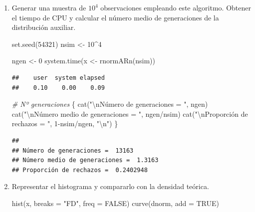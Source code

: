 \documentclass[
]{book}
\newenvironment{Shaded}{\begin{snugshade}}{\end{snugshade}}
\newcommand{\AttributeTok}[1]{\textcolor[rgb]{0.77,0.63,0.00}{#1}}
\newcommand{\CommentTok}[1]{\textcolor[rgb]{0.56,0.35,0.01}{\textit{#1}}}
\newcommand{\ConstantTok}[1]{\textcolor[rgb]{0.00,0.00,0.00}{#1}}
\newcommand{\DecValTok}[1]{\textcolor[rgb]{0.00,0.00,0.81}{#1}}
\newcommand{\FunctionTok}[1]{\textcolor[rgb]{0.00,0.00,0.00}{#1}}
\newcommand{\NormalTok}[1]{#1}
\newcommand{\OtherTok}[1]{\textcolor[rgb]{0.56,0.35,0.01}{#1}}
\newcommand{\SpecialCharTok}[1]{\textcolor[rgb]{0.00,0.00,0.00}{#1}}
\newcommand{\StringTok}[1]{\textcolor[rgb]{0.31,0.60,0.02}{#1}}
\theoremstyle{break}
\theoremstyle{definition}
\theoremstyle{definition}
\theoremstyle{definition}
\theoremstyle{definition}
\theoremstyle{remark}
\begin{document}
\begin{enumerate}
\def\labelenumi{\alph{enumi})}
\item
  Generar una muestra de \(10^{4}\) observaciones empleando este
  algoritmo. Obtener el tiempo de CPU y calcular el número medio
  de generaciones de la distribución auxiliar.

\begin{Shaded}
\begin{Highlighting}[]
\FunctionTok{set.seed}\NormalTok{(}\DecValTok{54321}\NormalTok{)}
\NormalTok{nsim }\OtherTok{\textless{}{-}} \DecValTok{10}\SpecialCharTok{\^{}}\DecValTok{4}

\NormalTok{ngen }\OtherTok{\textless{}{-}} \DecValTok{0}
\FunctionTok{system.time}\NormalTok{(x }\OtherTok{\textless{}{-}} \FunctionTok{rnormARn}\NormalTok{(nsim))}
\end{Highlighting}
\end{Shaded}

\begin{verbatim}
##    user  system elapsed 
##    0.10    0.00    0.09
\end{verbatim}

\begin{Shaded}
\begin{Highlighting}[]
\CommentTok{\# Nº generaciones}
\NormalTok{\{}
\FunctionTok{cat}\NormalTok{(}\StringTok{"}\SpecialCharTok{\textbackslash{}n}\StringTok{Número de generaciones = "}\NormalTok{, ngen)}
\FunctionTok{cat}\NormalTok{(}\StringTok{"}\SpecialCharTok{\textbackslash{}n}\StringTok{Número medio de generaciones = "}\NormalTok{, ngen}\SpecialCharTok{/}\NormalTok{nsim)}
\FunctionTok{cat}\NormalTok{(}\StringTok{"}\SpecialCharTok{\textbackslash{}n}\StringTok{Proporción de rechazos = "}\NormalTok{, }\DecValTok{1}\SpecialCharTok{{-}}\NormalTok{nsim}\SpecialCharTok{/}\NormalTok{ngen, }\StringTok{"}\SpecialCharTok{\textbackslash{}n}\StringTok{"}\NormalTok{)}
\NormalTok{\}}
\end{Highlighting}
\end{Shaded}

\begin{verbatim}
## 
## Número de generaciones =  13163
## Número medio de generaciones =  1.3163
## Proporción de rechazos =  0.2402948
\end{verbatim}
\item
  Representar el histograma y compararlo con la densidad teórica.

\begin{Shaded}
\begin{Highlighting}[]
\FunctionTok{hist}\NormalTok{(x, }\AttributeTok{breaks =} \StringTok{"FD"}\NormalTok{, }\AttributeTok{freq =} \ConstantTok{FALSE}\NormalTok{)}
\FunctionTok{curve}\NormalTok{(dnorm, }\AttributeTok{add =} \ConstantTok{TRUE}\NormalTok{)}
\end{Highlighting}
\end{Shaded}


\end{enumerate}
\end{document}
